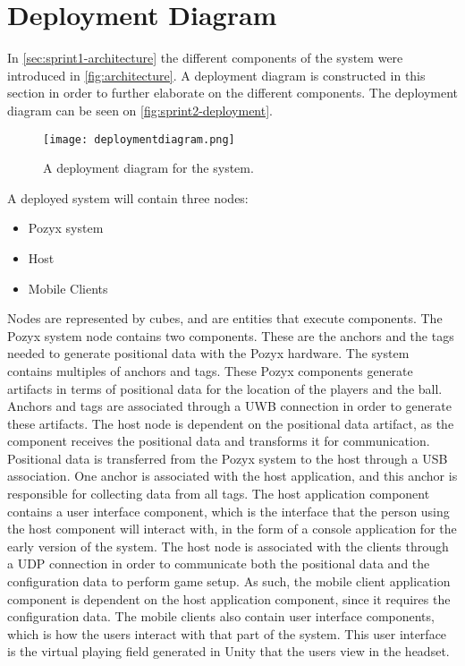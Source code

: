 \section{Deployment Diagram}\label{sec:sprint2-deploymentdia}
In \autoref{sec:sprint1-architecture} the different components of the system were introduced in \autoref{fig:architecture}.
A deployment diagram is constructed in this section in order to further elaborate on the different components.
The deployment diagram can be seen on \autoref{fig:sprint2-deployment}.
\begin{figure}[H]
    \centering
    \texttt{[image: deploymentdiagram.png]}
    \caption{A deployment diagram for the system.}
    \label{fig:sprint2-deployment}
\end{figure}
\noindent
A deployed system will contain three nodes:
\begin{itemize}
    \item Pozyx system
    \item Host
    \item Mobile Clients
\end{itemize}
Nodes are represented by cubes, and are entities that execute components.
The Pozyx system node contains two components.
These are the anchors and the tags needed to generate positional data with the Pozyx hardware.
The system contains multiples of anchors and tags.
These Pozyx components generate artifacts in terms of positional data for the location of the players and the ball.
Anchors and tags are associated through a UWB connection in order to generate these artifacts.
The host node is dependent on the positional data artifact, as the component receives the positional data and transforms it for communication.
Positional data is transferred from the Pozyx system to the host through a USB association.
One anchor is associated with the host application, and this anchor is responsible for collecting data from all tags.
The host application component contains a user interface component, which is the interface that the person using the host component will interact with, in the form of a console application for the early version of the system.
The host node is associated with the clients through a UDP connection in order to communicate both the positional data and the configuration data to perform game setup.
As such, the mobile client application component is dependent on the host application component, since it requires the configuration data.
The mobile clients also contain user interface components, which is how the users interact with that part of the system.
This user interface is the virtual playing field generated in Unity that the users view in the headset.
